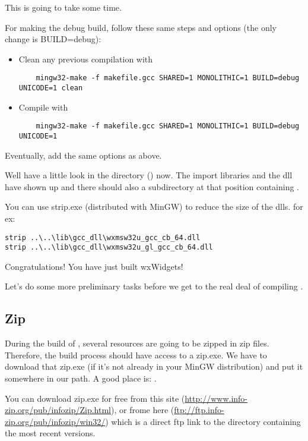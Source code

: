This is going to take some time.

For making the debug build, follow these same steps and options (the only change is BUILD=debug):

\begin{itemize}
\item Clean any previous compilation with
	\begin{verbatim}
	mingw32-make -f makefile.gcc SHARED=1 MONOLITHIC=1 BUILD=debug UNICODE=1 clean
	\end{verbatim}
\item Compile with
	\begin{verbatim}
	mingw32-make -f makefile.gcc SHARED=1 MONOLITHIC=1 BUILD=debug UNICODE=1
	\end{verbatim}
\end{itemize}

Eventually, add the same options as above.

Well have a little look in the directory () now. The import libraries and the dll have shown up and there should also a  subdirectory at that position containing .

You can use strip.exe (distributed with MinGW) to reduce the size of the dlls.
for ex:
\begin{verbatim}
strip ..\..\lib\gcc_dll\wxmsw32u_gcc_cb_64.dll
strip ..\..\lib\gcc_dll\wxmsw32u_gl_gcc_cb_64.dll
\end{verbatim}

Congratulations! You have just built wxWidgets!

Let's do some more preliminary tasks before we get to the real deal of compiling \codeblocks.

\subsection{Zip}

During the build of \codeblocks, several resources are going to be zipped in zip files. Therefore, the build process should have access to a zip.exe. We have to download that zip.exe (if it's not already in your MinGW distribution) and put it somewhere in our path. A good place is: .

You can download zip.exe for free from this site (\url{http://www.info-zip.org/pub/infozip/Zip.html}), or frome here (\url{ftp://ftp.info-zip.org/pub/infozip/win32/}) which is a direct ftp link to the directory containing the most recent versions.

